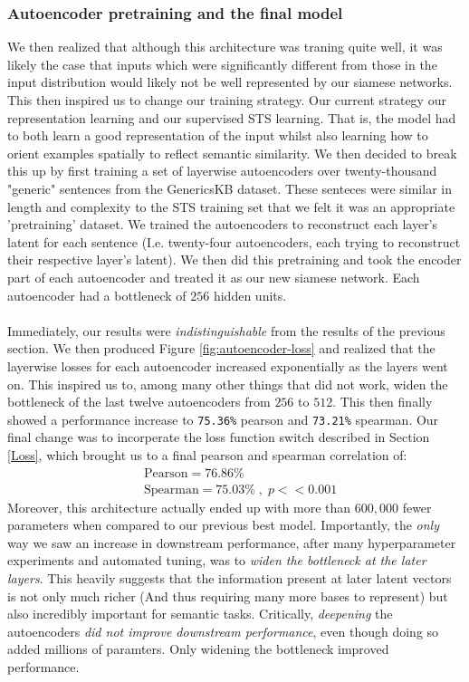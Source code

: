 \documentclass[14pt]{article}
\begin{document}
\subsubsection{Autoencoder pretraining and the final model}
We then realized that although this architecture was traning quite well, it was likely the case that inputs which were significantly different from those in the input distribution would likely not be well represented by our siamese networks. This then inspired us to change our training strategy. Our current strategy  our representation learning and our supervised STS learning. That is, the model had to both learn a good representation of the input whilst also learning how to orient examples spatially to reflect semantic similarity. We then decided to break this up by first training a set of layerwise autoencoders over twenty-thousand "generic" sentences from the GenericsKB \cite{bhakthavatsalam2020genericskbknowledgebasegeneric} dataset. These senteces were similar in length and complexity to the STS training set that we felt it was an appropriate 'pretraining' dataset. We trained the autoencoders to reconstruct each layer's latent for each sentence (I.e. twenty-four autoencoders, each trying to reconstruct their respective layer's latent). We then did this pretraining and took the encoder part of each autoencoder and treated it as our new siamese network. Each autoencoder had a bottleneck of $256$ hidden units.\\\\
Immediately, our results were \textit{indistinguishable} from the results of the previous section. We then produced Figure \ref{fig:autoencoder-loss} and realized that the layerwise losses for each autoencoder increased exponentially as the layers went on. This inspired us to, among many other things that did not work, widen the bottleneck of the last twelve autoencoders from $256$ to $512$. This then finally showed a performance increase to \verb|75.36%| pearson and \verb|73.21%| spearman. Our final change was to incorperate the loss function switch described in Section \ref{Loss}, which brought us to a final pearson and spearman correlation of:
\begin{align*}
    &\text{Pearson} = 76.86\%\\
    &\text{Spearman} = 75.03\%\;,\; p << 0.001
\end{align*}
Moreover, this architecture actually ended up with more than $600,000$ fewer parameters when compared to our previous best model. Importantly, the \textit{only} way we saw an increase in downstream performance, after many hyperparameter experiments and automated tuning, was to \textit{widen the bottleneck at the later layers}. This heavily suggests that the information present at later latent vectors is not only much richer (And thus requiring many more bases to represent) but also incredibly important for semantic tasks. Critically, \textit{deepening} the autoencoders \textit{did not improve downstream performance}, even though doing so added millions of paramters. Only widening the bottleneck improved performance.
\end{document}
